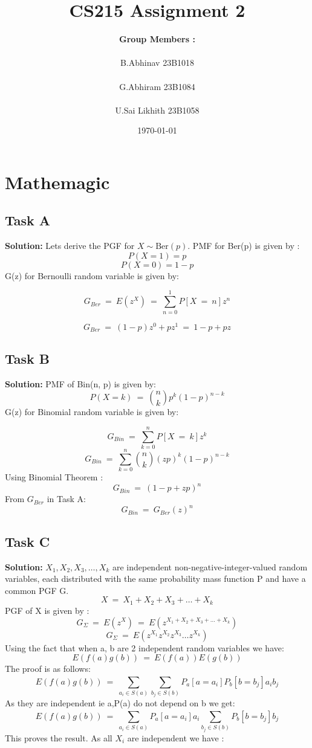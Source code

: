 \documentclass[12pt]{article}
\title{\Huge\textbf{CS215 Assignment 2}}
\author{\Large\textbf{ Group Members :} \\ \\ 
    \large B.Abhinav  23B1018 \\ \\ 
    \large G.Abhiram  23B1084 \\ \\
    \large U.Sai Likhith 23B1058 
}
\date{\today}
\begin{document}
\maketitle
\newpage

\tableofcontents
\newpage

\section{Mathemagic}
\subsection{Task A}
\textbf{Solution: } \newline
Lets derive the PGF for $X \sim \text{Ber}(p)$. PMF for Ber(p) is given by :
\[P(X=1) = p\]
\[P(X=0) = 1-p\]
G(z) for Bernoulli random variable is given by:

\[G_{Ber}\ =\ E(z^X)\ =\ \sum_{n=0}^{1}P[X\ =\ n]z^n \]

\begin{equation}
    G_{Ber}\ =\ (1-p)z^0+pz^1\ =\ 1-p+pz
\end{equation}

\subsection{Task B}
\textbf{Solution: } \newline
PMF of Bin(n, p) is given by: 
\[P(X=k)\ =\ \binom{n}{k}p^k(1-p)^{n-k}\]
G(z) for Binomial random variable is given by:

\[G_{Bin}\ =\ \sum_{k=0}^nP[X\ =\ k]z^k\]
\[G_{Bin}\ =\ \sum_{k=0}^n\binom{n}{k}(zp)^k(1-p)^{n-k}\]
Using Binomial Theorem :
\[G_{Bin}\ =\ (1-p+zp)^{n}\]
From $G_{Ber}$ in Task A:
\begin{equation}
    G_{Bin}\ =\ G_{Ber}(z)^n
\end{equation}

\subsection{Task C}
\textbf{Solution: } \newline
$X_1,X_2,X_3,\dots,X_k$ are independent non-negative-integer-valued random variables, each distributed with the same probability mass function P and have a common PGF G.
\[X\ =\ X_1+X_2+X_3+\dots+X_k\]
PGF of X is given by :
\[G_{\Sigma}\ =\ E(z^X)\ =\ E(z^{X_1+X_2+X_3+\dots+X_k})\]
\[G_{\Sigma}\ =\ E(z^{X_1}z^{X_2}z^{X_3}\dots z^{X_k})\]
Using the fact that when a, b are 2 independent random variables we have:
\begin{equation}
    E(f(a)g(b))\ =\ E(f(a))E(g(b))
\end{equation}
The proof is as follows:
\[E(f(a)g(b))\ =\ \sum_{a_i\in S(a)}^{}\sum_{b_j\in S(b)}^{}P_a[a=a_i]P_b[b=b_j]a_ib_j\]
As they are independent ie a,P(a) do not depend on b we get:
\[E(f(a)g(b))\ =\ \sum_{a_i\in S(a)}^{}P_a[a=a_i]a_i\sum_{b_j\in S(b)}^{}P_b[b=b_j]b_j\]
This proves the result.
As all $X_i$ are independent we have :
\end{document}
